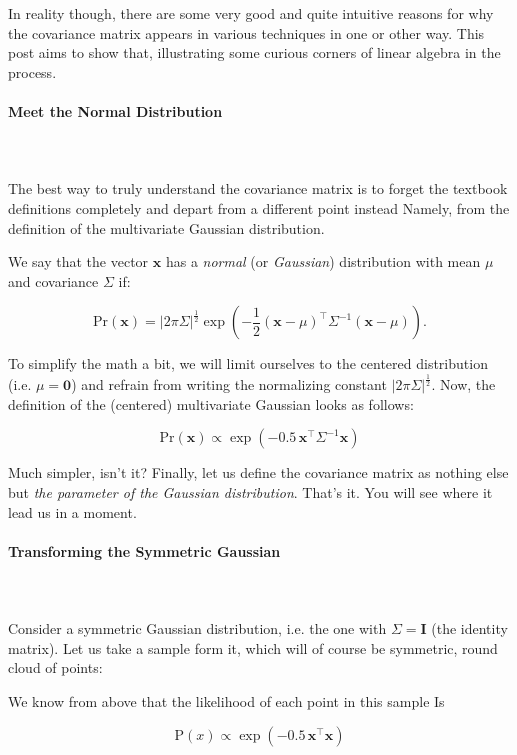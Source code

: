 \documentclass{article}
\begin{document}
In reality though, there are some very good and quite intuitive reasons for why the covariance matrix appears in various techniques in one or other way. This post aims to show that, illustrating some curious corners of linear algebra in the process.

\paragraph{Meet the Normal Distribution}\mbox{}\\\\
The best way to truly understand the covariance matrix is to forget the textbook definitions completely and depart from a different point instead Namely, from the definition of the multivariate Gaussian distribution.\medskip

We say that the vector $\bm{x}$ has a \textit{normal} (or \textit{Gaussian}) distribution with mean $\mu$ and covariance $\Sigma$ if:

$$
 \text{Pr}(\bm{x}) = \big|2\pi\Sigma\big|^{\frac{1}{2}} \exp\left(-\frac{1}{2}(\bm{x}-\mu)^{\intercal}\Sigma^{-1}(\bm{x}-\mu)\right).
$$

To simplify the math a bit, we will limit ourselves to the centered distribution (i.e. $\mu = \bm{0}$) and refrain from writing the normalizing constant $\big|2\pi\Sigma\big|^{\frac{1}{2}}$. Now, the definition of the (centered) multivariate Gaussian looks as follows:

$$
  \text{Pr}(\bm{x})\propto\exp\left(-0.5\,\bm{x}^{\intercal}\Sigma^{-1}\bm{x}\right)
$$

Much simpler, isn't it? Finally, let us define the covariance matrix as nothing else but \textit{the parameter of the Gaussian distribution}. That's it. You will see where it lead us in a moment.

\paragraph{Transforming the Symmetric Gaussian}\mbox{}\\\\
Consider a symmetric Gaussian distribution, i.e. the one with $\Sigma = \bm{I}$ (the identity matrix). Let us take a sample form it, which will of course be symmetric, round cloud of points:


We know from above that the likelihood of each point in this sample Is

\begin{equation}
  \label{symmetric_gaussian_probability}
  \text{P}(x)\propto\exp\left(-0.5\,\bm{x}^{\intercal}\bm{x}\right)
\end{equation}
\end{document}
